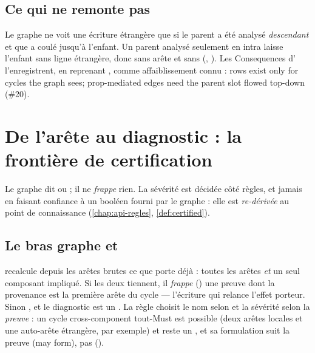 \subsection{Ce qui ne remonte pas}

Le graphe ne voit une écriture étrangère que si le parent a été analysé \emph{descendant}
et que  a coulé jusqu'à l'enfant. Un parent analysé seulement en intra
laisse l'enfant sans ligne étrangère, donc sans arête et sans
 (, ). Les Consequences
d' l'enregistrent, en reprenant , comme affaiblissement connu : \og rows
exist only for cycles the graph sees; prop-mediated edges need the parent slot flowed
top-down (\#20)\fg.

\section{De l'arête au diagnostic : la frontière de certification}
\label{sec:churn-certification}

Le graphe dit  ou  ; il ne \emph{frappe} rien. La sévérité est
décidée côté règles, et jamais en faisant confiance à un booléen fourni par le graphe :
elle est \emph{re-dérivée} au point de connaissance (\cref{chap:api-regles},
\cref{def:certified}).

\subsection{Le bras graphe et }



 recalcule depuis les arêtes brutes ce que  porte
déjà : toutes les arêtes  \emph{et} un seul composant impliqué. Si les deux
tiennent, il \emph{frappe} () une preuve  dont
la provenance est la première arête du cycle --- l'écriture qui relance l'effet porteur.
Sinon , et le diagnostic est un \Warning. La règle choisit le nom
selon  et la sévérité selon la \emph{preuve} : un cycle
cross-component tout-Must est possible (deux arêtes  locales et une auto-arête
étrangère, par exemple) et reste un \Warning, et sa formulation suit la preuve (\og may
form\fg), pas  ().

